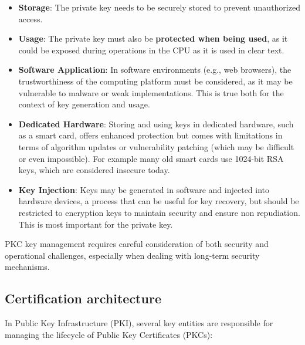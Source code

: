\begin{itemize}
  \item \textbf{Storage}: The private key needs to be securely
    stored to prevent unauthorized access.
  \item \textbf{Usage}: The private key must also be \textbf{protected
    when being used}, as it could be exposed during operations in the
    CPU as it is used in clear text.
  \item \textbf{Software Application}: In software environments
    (e.g., web browsers), the trustworthiness of the computing
    platform must be considered, as it may be vulnerable to malware
    or weak implementations. This is true both for the context of
    key generation and usage.
  \item \textbf{Dedicated Hardware}: Storing and using keys in
    dedicated hardware, such as a smart card, offers enhanced
    protection but comes with limitations in terms of algorithm
    updates or vulnerability patching (which may be difficult or
    even impossible). For example many old smart cards use 1024-bit 
    RSA keys, which are considered insecure today.
  \item \textbf{Key Injection}: Keys may be generated in software
    and injected into hardware devices, a process that can be useful
    for key recovery, but should be restricted to encryption keys to
    maintain security and ensure non repudiation. This is most
    important for the private key. 
\end{itemize}

PKC key management requires careful consideration of both security and
operational challenges, especially when dealing with long-term
security mechanisms.

\subsection{Certification architecture}

In Public Key Infrastructure (PKI), several key entities are
responsible for managing the lifecycle of Public Key Certificates
(PKCs):

